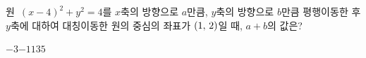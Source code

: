 원~$(x-4)^2+y^2=4$를 $x$축의 방향으로 $a$만큼, $y$축의 방향으로 $b$만큼 평행이동한 후 $y$축에 대하여 대칭이동한 원의 중심의 좌표가 $(1,\mkern3mu 2)$일 때, $a+b$의 값은?
\begin{choices32}{$-3$}{$-1$}{$1$}{$3$}{$5$}\end{choices32}
